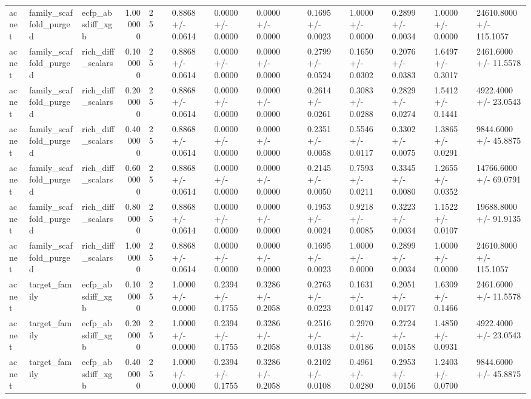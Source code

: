 \begin{longtable}{lllrlllllllllll}
acnet & family\_scaffold\_purged & ecfp\_absdiff\_xgb & 1.000000 & 25 &  & 0.8868 +/- 0.0614 & 0.0000 +/- 0.0000 & 0.0000 +/- 0.0000 &  & 0.1695 +/- 0.0023 & 1.0000 +/- 0.0000 & 0.2899 +/- 0.0034 & 1.0000 +/- 0.0000 & 24610.8000 +/- 115.1057 \\
acnet & family\_scaffold\_purged & rich\_diff\_scalars & 0.100000 & 25 &  & 0.8868 +/- 0.0614 & 0.0000 +/- 0.0000 & 0.0000 +/- 0.0000 &  & 0.2799 +/- 0.0524 & 0.1650 +/- 0.0302 & 0.2076 +/- 0.0383 & 1.6497 +/- 0.3017 & 2461.6000 +/- 11.5578 \\
acnet & family\_scaffold\_purged & rich\_diff\_scalars & 0.200000 & 25 &  & 0.8868 +/- 0.0614 & 0.0000 +/- 0.0000 & 0.0000 +/- 0.0000 &  & 0.2614 +/- 0.0261 & 0.3083 +/- 0.0288 & 0.2829 +/- 0.0274 & 1.5412 +/- 0.1441 & 4922.4000 +/- 23.0543 \\
acnet & family\_scaffold\_purged & rich\_diff\_scalars & 0.400000 & 25 &  & 0.8868 +/- 0.0614 & 0.0000 +/- 0.0000 & 0.0000 +/- 0.0000 &  & 0.2351 +/- 0.0058 & 0.5546 +/- 0.0117 & 0.3302 +/- 0.0075 & 1.3865 +/- 0.0291 & 9844.6000 +/- 45.8875 \\
acnet & family\_scaffold\_purged & rich\_diff\_scalars & 0.600000 & 25 &  & 0.8868 +/- 0.0614 & 0.0000 +/- 0.0000 & 0.0000 +/- 0.0000 &  & 0.2145 +/- 0.0050 & 0.7593 +/- 0.0211 & 0.3345 +/- 0.0080 & 1.2655 +/- 0.0352 & 14766.6000 +/- 69.0791 \\
acnet & family\_scaffold\_purged & rich\_diff\_scalars & 0.800000 & 25 &  & 0.8868 +/- 0.0614 & 0.0000 +/- 0.0000 & 0.0000 +/- 0.0000 &  & 0.1953 +/- 0.0024 & 0.9218 +/- 0.0085 & 0.3223 +/- 0.0034 & 1.1522 +/- 0.0107 & 19688.8000 +/- 91.9135 \\
acnet & family\_scaffold\_purged & rich\_diff\_scalars & 1.000000 & 25 &  & 0.8868 +/- 0.0614 & 0.0000 +/- 0.0000 & 0.0000 +/- 0.0000 &  & 0.1695 +/- 0.0023 & 1.0000 +/- 0.0000 & 0.2899 +/- 0.0034 & 1.0000 +/- 0.0000 & 24610.8000 +/- 115.1057 \\
acnet & target\_family & ecfp\_absdiff\_xgb & 0.100000 & 25 &  & 1.0000 +/- 0.0000 & 0.2394 +/- 0.1755 & 0.3286 +/- 0.2058 &  & 0.2763 +/- 0.0223 & 0.1631 +/- 0.0147 & 0.2051 +/- 0.0177 & 1.6309 +/- 0.1466 & 2461.6000 +/- 11.5578 \\
acnet & target\_family & ecfp\_absdiff\_xgb & 0.200000 & 25 &  & 1.0000 +/- 0.0000 & 0.2394 +/- 0.1755 & 0.3286 +/- 0.2058 &  & 0.2516 +/- 0.0138 & 0.2970 +/- 0.0186 & 0.2724 +/- 0.0158 & 1.4850 +/- 0.0931 & 4922.4000 +/- 23.0543 \\
acnet & target\_family & ecfp\_absdiff\_xgb & 0.400000 & 25 &  & 1.0000 +/- 0.0000 & 0.2394 +/- 0.1755 & 0.3286 +/- 0.2058 &  & 0.2102 +/- 0.0108 & 0.4961 +/- 0.0280 & 0.2953 +/- 0.0156 & 1.2403 +/- 0.0700 & 9844.6000 +/- 45.8875 \\

\end{longtable}
